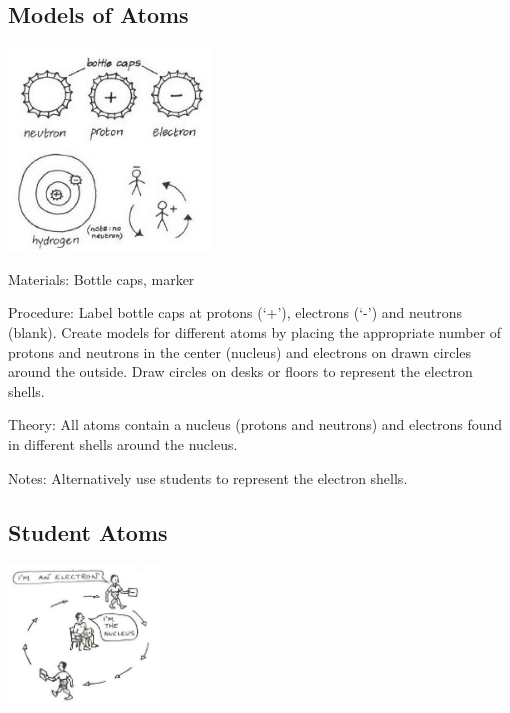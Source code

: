 \begin{multicols}{2}
\subsection{Models of Atoms}

\begin{center}
\includegraphics[width=0.4\textwidth]{./img/vso/atom-model.jpg}
\end{center}

\begin{description*}
\item[Materials:]{Bottle caps, marker}
\item[Procedure:]{Label bottle caps at protons (`+'), electrons (`-') and neutrons (blank). Create models for different atoms by placing the appropriate number of protons and neutrons in the center (nucleus) and electrons on drawn circles around the outside. Draw circles on desks or
floors to represent the electron
shells. }
\item[Theory:]{All atoms contain a nucleus
(protons and neutrons) and
electrons found in different shells around the nucleus. }
\item[Notes:]{Alternatively use students
to represent the electron shells.}
\end{description*}

\subsection{Student Atoms}

\begin{center}
\includegraphics[width=0.3\textwidth]{./img/source/student-atom.jpg}
\end{center}


\end{multicols}
